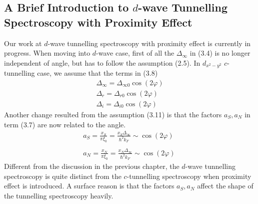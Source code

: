 \subsection{A Brief Introduction to $d$-wave Tunnelling Spectroscopy with Proximity Effect}
Our work at $d$-wave tunnelling spectroscopy with proximity effect is currently in progress. When moving into $d$-wave case, first of all the $\Delta_{\infty}$ in (3.4) is no longer independent of angle, but has to follow the assumption (2.5). In $d_{x^2-y^2}$ $c$-tunnelling case, we assume that the terms in (3.8)
\begin{eqnarray}
\Delta_{\infty}=\Delta_{\infty0}\cos(2\varphi)\nonumber\\
\Delta_r=\Delta_{r0}\cos(2\varphi)\\
\Delta_i=\Delta_{i0}\cos(2\varphi)\nonumber
\end{eqnarray}
Another change resulted from the assumption (3.11) is that the factors $a_S, a_N$ in term (3.7) are now related to the angle.
\begin{eqnarray}
a_S=\frac{x_S}{\pi\xi_0}=\frac{x_S\Delta_{\infty}}{\hbar^2k_F}\sim\cos(2\varphi)\nonumber\\
\\
a_N=\frac{x_N}{\pi\xi_0}=\frac{x_N\Delta_{\infty}}{\hbar^2k_F}\sim\cos(2\varphi)\nonumber\
\end{eqnarray}
Different from the discussion in the previous chapter, the $d$-wave tunnelling spectroscopy is quite distinct from the $c$-tunnelling spectroscopy when proximity effect is introduced. A surface reason is that the factors $a_S, a_N$ affect the shape of the tunnelling spectroscopy heavily.










